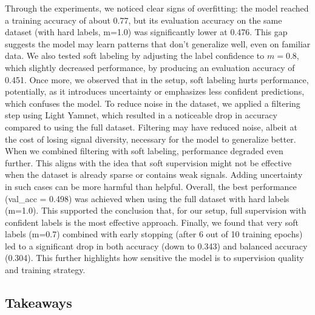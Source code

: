 \documentclass[10pt]{article}
\begin{document}
Through the experiments, we noticed clear signs of overfitting: the model reached a training accuracy of about 0.77, but its evaluation accuracy on the same dataset (with hard labels, m=1.0) was significantly lower at 0.476. This gap suggests the model may learn patterns that don't generalize well, even on familiar data. We also tested soft labeling by adjusting the label confidence to $m=0.8$, which slightly decreased performance, by producing an evaluation accuracy of 0.451. Once more, we observed that in the setup, soft labeling hurts performance, potentially, as it introduces uncertainty or emphasizes less confident predictions, which confuses the model. To reduce noise in the dataset, we applied a filtering step using Light Yamnet, which resulted in a noticeable drop in accuracy compared to using the full dataset. Filtering may have reduced noise, albeit at the cost of losing signal diversity, necessary for the model to generalize better. When we combined filtering with soft labeling, performance degraded even further. This aligns with the idea that soft supervision might not be effective when the dataset is already sparse or contains weak signals. Adding uncertainty in such cases can be more harmful than helpful. Overall, the best performance (val\_acc = 0.498) was achieved when using the full dataset with hard labels (m=1.0). This supported the conclusion that, for our setup, full supervision with confident labels is the most effective approach. Finally, we found that very soft labels (m=0.7) combined with early stopping (after 6 out of 10 training epochs) led to a significant drop in both accuracy (down to 0.343) and balanced accuracy (0.304). This further highlights how sensitive the model is to supervision quality and training strategy.

\subsection*{Takeaways}
\end{document}
